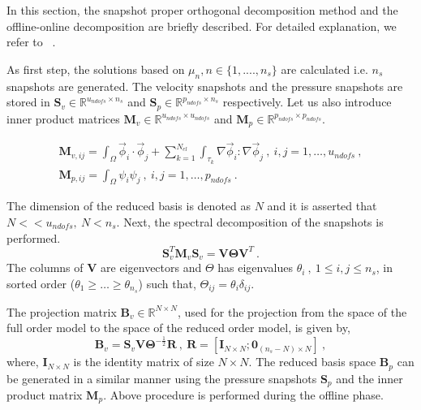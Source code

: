\documentclass[graybox]{svmult}
\begin{document}
In this section, the snapshot proper orthogonal decomposition method and the offline-online decomposition are briefly described. For detailed explanation, we refer to ~\cite{CRBM}.

As first step, the solutions based on $\mu_n, n \in \lbrace 1,....,n_s \rbrace$ are calculated i.e. $n_s$ snapshots are generated. The velocity snapshots and the pressure snapshots are stored in $\bm{S}_v \in \mathbb{R}^{u_{ndofs} \times n_s}$ and $\bm{S}_p \in \mathbb{R}^{p_{ndofs} \times n_s}$ respectively. Let us also introduce inner product matrices $\bm{M}_v \in \mathbb{R}^{u_{ndofs} \times u_{ndofs}}$ and $\bm{M}_p \in \mathbb{R}^{p_{ndofs} \times p_{ndofs}}$.

\begin{gather*}
\bm{M}_{v,ij} = \int_{\Omega} \overrightarrow{\phi}_i \cdot \overrightarrow{\phi}_j + \sum_{k=1}^{N_{el}} \int_{\tau_k} \nabla \overrightarrow{\phi}_i : \nabla \overrightarrow{\phi}_j \ , \ i,j = 1, \ldots, u_{ndofs} \ , \\
\bm{M}_{p,ij} = \int_{\Omega} \psi_i \psi_j \ , \ i,j = 1, \ldots, p_{ndofs} \ .
\end{gather*}

The dimension of the reduced basis is denoted as $N$ and it is asserted that $N << u_{ndofs}, \ N < n_s$. Next, the spectral decomposition of the snapshots is performed.
\begin{equation}\label{snapshot_eigen_value}
\bm{S}_v^T \bm{M}_v \bm{S}_v = \bm{V} \bm{\Theta} \bm{V}^T \ .
\end{equation}
The columns of $\bm{V}$ are eigenvectors and $\Theta$ has eigenvalues $\theta_i \ , \ 1 \leq i,j \leq n_s$, in sorted order ($\theta_1 \geq \ldots \geq \theta_{n_s}$) such that, $\Theta_{ij} = \theta_i \delta_{ij}$.

The projection matrix $\bm{B}_v \in \mathbb{R}^{N \times N}$, used for the projection from the space of the full order model to the space of the reduced order model, is given by, 
\begin{equation}
\bm{B}_v = \bm{S}_v \bm{V} \bm{\Theta}^{-\frac{1}{2}} \bm{R} \ , \ \bm{R} = [\bm{I}_{N \times N} ; \bm{0}_{(n_s-N) \times N}] \ ,
\end{equation}
where, $\bm{I}_{N \times N}$ is the identity matrix of size $N \times N$.
The reduced basis space $\bm{B}_p$ can be generated in a similar manner using the pressure snapshots $\bm{S}_p$ and the inner product matrix $\bm{M}_p$. Above procedure is performed during the offline phase.
\end{document}
